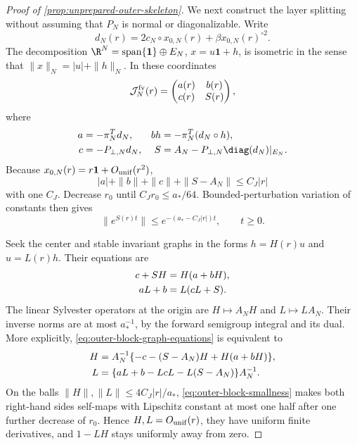 \begin{proof}[Proof of \cref{prop:unprepared-outer-skeleton}]
We next construct the layer splitting without assuming that \(P_N\) is
normal or diagonalizable.  Write
\begin{equation}
 d_N(r)=2c_N\circ x_{0,N}(r)
          +\beta x_{0,N}(r)^{\circ2}.                \label{eq:outer-diagonal-coefficient}
\end{equation}
The decomposition
\(\R^N=\operatorname{span}\{\mathbf1\}\oplus E_N\),
\(x=u\mathbf1+h\), is isometric in the sense that
\(\|x\|_N=|u|+\|h\|_N\).  In these coordinates
\begin{equation}
 \mathcal J^{\rm fv}_{N}(r)=
 \begin{pmatrix}a(r)&b(r)\\c(r)&S(r)\end{pmatrix},             \label{eq:outer-J-blocks}
\end{equation}
where
\begin{align}
 a&=-\pi_N^Td_N,&
 bh&=-\pi_N^T(d_N\circ h),\notag\\
 c&=-P_{\perp,N}d_N,&
 S&=A_N-P_{\perp,N}\diag(d_N)|_{E_N}.               \label{eq:outer-block-formulas}
\end{align}
Because \(x_{0,N}(r)=r\mathbf1+O_{\rm unif}(r^2)\),
\begin{equation}
 |a|+\|b\|+\|c\|+\|S-A_N\|\le C_J|r|              \label{eq:outer-block-smallness}
\end{equation}
with one \(C_J\).  Decrease \(r_0\) until
\(C_Jr_0\le a_*/64\).  Bounded-perturbation variation of constants then
gives
\begin{equation}
 \|e^{S(r)t}\|\le e^{-(a_*-C_J|r|)t},\qquad t\ge0. \label{eq:outer-S-semigroup}
\end{equation}

Seek the center and stable invariant graphs in the forms \(h=H(r)u\) and
\(u=L(r)h\).  Their equations are
\begin{align}
 c+SH&=H(a+bH),\notag\\
 aL+b&=L(cL+S).                                      \label{eq:outer-block-graph-equations}
\end{align}
The linear Sylvester operators at the origin are
\(H\mapsto A_NH\) and \(L\mapsto LA_N\).  Their inverse norms are at most
\(a_*^{-1}\), by the forward semigroup integral and its dual.  More
explicitly, \cref{eq:outer-block-graph-equations} is equivalent to
\begin{align}
 H&=A_N^{-1}\{-c-(S-A_N)H+H(a+bH)\},\notag\\
 L&=\{aL+b-LcL-L(S-A_N)\}A_N^{-1}.                  \label{eq:outer-HL-contractions}
\end{align}
On the balls \(\|H\|,\|L\|\le4C_J|r|/a_*\),
\cref{eq:outer-block-smallness} makes both right-hand sides self-maps with
Lipschitz constant at most one half after one further decrease of \(r_0\).
Hence \(H,L=O_{\rm unif}(r)\), they have uniform finite derivatives, and
\(1-LH\) stays uniformly away from zero.


\end{proof}
